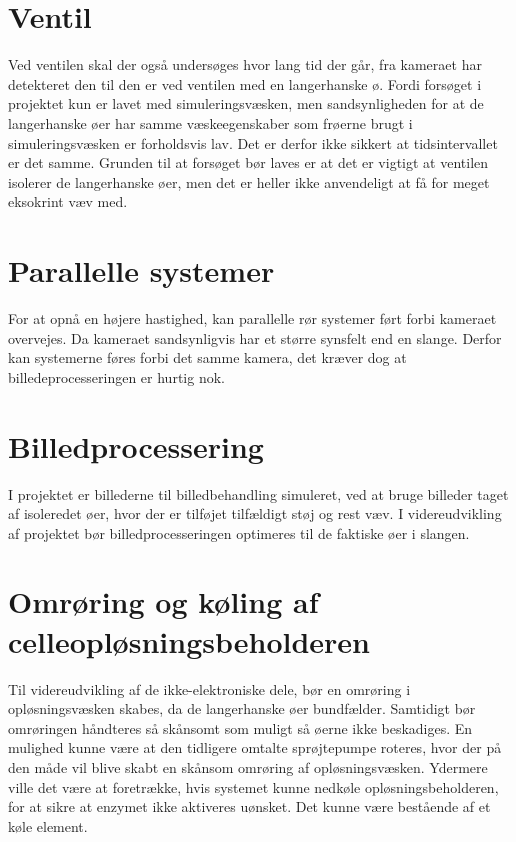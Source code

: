 \section{Ventil}
Ved ventilen skal der også undersøges hvor lang tid der går, fra kameraet har detekteret den til den er ved ventilen med en langerhanske ø. Fordi forsøget i projektet kun er lavet med simuleringsvæsken, men sandsynligheden for at de langerhanske øer har samme væskeegenskaber som frøerne brugt i simuleringsvæsken er forholdsvis lav. Det er derfor ikke sikkert at tidsintervallet er det samme. Grunden til at forsøget bør laves er at det er vigtigt at ventilen isolerer de langerhanske øer, men det er heller ikke anvendeligt at få for meget eksokrint væv med.

\section{Parallelle systemer}
For at opnå en højere hastighed, kan parallelle rør systemer ført forbi kameraet overvejes.
Da kameraet sandsynligvis har et større synsfelt end en slange. Derfor kan systemerne føres forbi det samme kamera, det kræver dog at billedeprocesseringen er hurtig nok.

\section{Billedprocessering}
I projektet er billederne til billedbehandling simuleret, ved at bruge billeder taget af isoleredet øer, hvor der er tilføjet tilfældigt støj og rest væv. I videreudvikling af projektet bør billedprocesseringen optimeres til de faktiske øer i slangen.

\section{Omrøring og køling af celleopløsningsbeholderen}
Til videreudvikling af de ikke-elektroniske dele, bør en omrøring i opløsningsvæsken skabes, da de langerhanske øer bundfælder. Samtidigt bør omrøringen håndteres så skånsomt som muligt så øerne ikke beskadiges. En mulighed kunne være at den tidligere omtalte sprøjtepumpe roteres, hvor der på den måde vil blive skabt en skånsom omrøring af opløsningsvæsken. Ydermere ville det være at foretrække, hvis systemet kunne nedkøle opløsningsbeholderen, for at sikre at enzymet ikke aktiveres uønsket. Det kunne være bestående af et køle element. 

